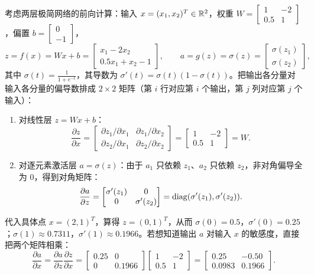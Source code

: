\begin{example}\label{ex:ch5-2d-jac}
考虑两层极简网络的前向计算：输入 $x = (x_1, x_2)^T \in \mathbb{R}^2$，权重 $W = \begin{bmatrix} 1 & -2 \\ 0.5 & 1 \end{bmatrix}$，偏置 $b = \begin{bmatrix} 0 \\ -1 \end{bmatrix}$，
\[
  z = f(x) = W x + b = \begin{bmatrix} x_1 - 2x_2 \\ 0.5 x_1 + x_2 - 1 \end{bmatrix},
  \qquad
  a = g(z) = \sigma(z) = \begin{bmatrix} \sigma(z_1) \\ \sigma(z_2) \end{bmatrix},
\]
其中 $\sigma(t) = \frac{1}{1+e^{-t}}$，其导数为 $\sigma'(t) = \sigma(t)(1-\sigma(t))$。把输出各分量对输入各分量的偏导数排成 $2\times 2$ 矩阵（第 $i$ 行对应第 $i$ 个输出，第 $j$ 列对应第 $j$ 个输入）：
\begin{enumerate}
  \item 对线性层 $z = Wx + b$：
  \[
    \frac{\partial z}{\partial x} =
    \begin{bmatrix}
      \partial z_1/\partial x_1 & \partial z_1/\partial x_2 \\
      \partial z_2/\partial x_1 & \partial z_2/\partial x_2
    \end{bmatrix}
    = \begin{bmatrix} 1 & -2 \\ 0.5 & 1 \end{bmatrix} = W.
  \]
  \item 对逐元素激活层 $a = \sigma(z)$：由于 $a_1$ 只依赖 $z_1$、$a_2$ 只依赖 $z_2$，非对角偏导全为 $0$，得到对角矩阵：
  \[
    \frac{\partial a}{\partial z} =
    \begin{bmatrix}
      \sigma'(z_1) & 0 \\
      0 & \sigma'(z_2)
    \end{bmatrix}
    = \operatorname{diag}(\sigma'(z_1), \sigma'(z_2)).
  \]
\end{enumerate}
代入具体点 $x = (2, 1)^T$，算得 $z = (0, 1)^T$，从而 $\sigma(0) = 0.5$，$\sigma'(0) = 0.25$；$\sigma(1)\approx 0.7311$，$\sigma'(1)\approx 0.1966$。若想知道输出 $a$ 对输入 $x$ 的敏感度，直接把两个矩阵相乘：
\[
  \frac{\partial a}{\partial x} = \frac{\partial a}{\partial z}\frac{\partial z}{\partial x}
  = \begin{bmatrix} 0.25 & 0 \\ 0 & 0.1966 \end{bmatrix}
    \begin{bmatrix} 1 & -2 \\ 0.5 & 1 \end{bmatrix}
  = \begin{bmatrix} 0.25 & -0.50 \\ 0.0983 & 0.1966 \end{bmatrix}.
\]
\end{example}


